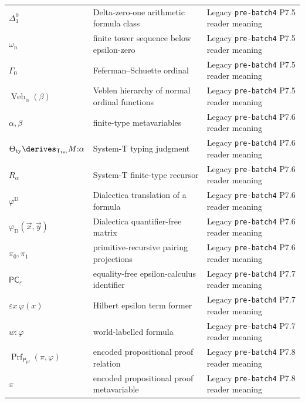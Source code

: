 \begin{longtable}{@{}p{}p{}p{}@{}}
\(\Delta^0_1\) & Delta-zero-one arithmetic formula class & Legacy \texttt{pre-\allowbreak{}batch4} P7.\allowbreak{}5 reader meaning \\
\(\omega_n\) & finite tower sequence below epsilon-zero & Legacy \texttt{pre-\allowbreak{}batch4} P7.\allowbreak{}5 reader meaning \\
\(\Gamma_0\) & Feferman--Schuette ordinal & Legacy \texttt{pre-\allowbreak{}batch4} P7.\allowbreak{}5 reader meaning \\
\(\operatorname{Veb}_{\alpha}(\beta)\) & Veblen hierarchy of normal ordinal functions & Legacy \texttt{pre-\allowbreak{}batch4} P7.\allowbreak{}5 reader meaning \\
\(\alpha,\allowbreak \beta\) & finite-type metavariables & Legacy \texttt{pre-\allowbreak{}batch4} P7.\allowbreak{}6 reader meaning \\
\(\Theta_{\mathrm{ty}}\derives_{\mathsf T_{\mathrm{tm}}}M{:}\alpha\) & System-T typing judgment & Legacy \texttt{pre-\allowbreak{}batch4} P7.\allowbreak{}6 reader meaning \\
\(R_\alpha\) & System-T finite-type recursor & Legacy \texttt{pre-\allowbreak{}batch4} P7.\allowbreak{}6 reader meaning \\
\(\varphi^{\mathrm D}\) & Dialectica translation of a formula & Legacy \texttt{pre-\allowbreak{}batch4} P7.\allowbreak{}6 reader meaning \\
\(\varphi_{\mathrm D}(\vec x,\allowbreak \vec y)\) & Dialectica quantifier-free matrix & Legacy \texttt{pre-\allowbreak{}batch4} P7.\allowbreak{}6 reader meaning \\
\(\pi_0,\allowbreak \pi_1\) & primitive-recursive pairing projections & Legacy \texttt{pre-\allowbreak{}batch4} P7.\allowbreak{}6 reader meaning \\
\(\mathsf{PC}_{\varepsilon}\) & equality-free epsilon-calculus identifier & Legacy \texttt{pre-\allowbreak{}batch4} P7.\allowbreak{}7 reader meaning \\
\(\varepsilon x\,\varphi(x)\) & Hilbert epsilon term former & Legacy \texttt{pre-\allowbreak{}batch4} P7.\allowbreak{}7 reader meaning \\
\(w{:}\varphi\) & world-labelled formula & Legacy \texttt{pre-\allowbreak{}batch4} P7.\allowbreak{}7 reader meaning \\
\(\operatorname{Prf}_{\mathsf P_{\mathrm{pf}}}(\pi,\allowbreak \varphi)\) & encoded propositional proof relation & Legacy \texttt{pre-\allowbreak{}batch4} P7.\allowbreak{}8 reader meaning \\
\(\pi\) & encoded propositional proof metavariable & Legacy \texttt{pre-\allowbreak{}batch4} P7.\allowbreak{}8 reader meaning \\

\end{longtable}
